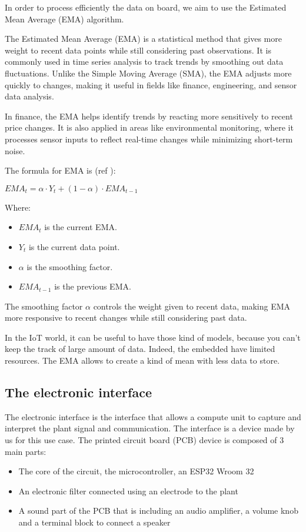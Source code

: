 In order to process efficiently the data on board, we aim to use the Estimated Mean Average (EMA) algorithm.

The Estimated Mean Average (EMA) is a statistical method that gives more weight to recent data points while still considering past observations. It is commonly used in time series analysis to track trends by smoothing out data fluctuations. Unlike the Simple Moving Average (SMA), the EMA adjusts more quickly to changes, making it useful in fields like finance, engineering, and sensor data analysis.

In finance, the EMA helps identify trends by reacting more sensitively to recent price changes. It is also applied in areas like environmental monitoring, where it processes sensor inputs to reflect real-time changes while minimizing short-term noise.

The formula for EMA is (ref \cite{hunter1986exponentially}):

\begin{math}
    EMA_t=\alpha⋅Y_t+(1-\alpha)⋅EMA_{t-1}

\end{math}

Where:
\begin{itemize}
    \item $EMA_t$ is the current EMA.
    \item $Y_t$ is the current data point.
    \item $\alpha$ is the smoothing factor.
    \item $EMA_{t-1}$ is the previous EMA.
\end{itemize}


The smoothing factor $\alpha$ controls the weight given to recent data, making EMA more responsive to recent changes while still considering past data.

In the IoT world, it can be useful to have those kind of models, because you can't keep the track of large amount of data. Indeed, the embedded have limited resources. The EMA allows to create a kind of mean with less data to store.


\subsection{The electronic interface}

The electronic interface is the interface that allows a compute unit to capture and interpret the plant signal and
communication. The interface is a device made by us for this use case. The printed circuit board (PCB)
device is composed of 3 main parts:
\begin{itemize}
    \item The core of the circuit, the microcontroller, an ESP32 Wroom 32
    \item An electronic filter connected using an electrode to the plant
    \item A sound part of the PCB that is including an audio amplifier, a volume knob and a terminal block to connect a speaker
\end{itemize}

